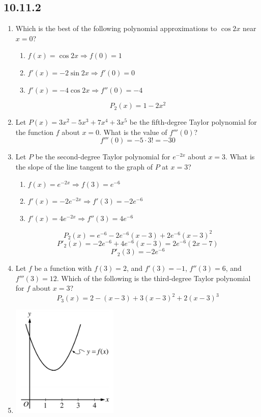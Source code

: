 \documentclass[12pt]{article}
\begin{document}
\subsection*{10.11.2}
\begin{enumerate}
	\item Which is the best of the following polynomial approximations to $\cos 2x$ near $x = 0$?
	      \begin{enumerate}
	      	\item $f(x) = \cos 2x \Longrightarrow f(0) = 1$
	      	\item $f'(x) = -2 \sin 2x \Longrightarrow f'(0) = 0$
	      	\item $f'(x) = -4 \cos 2x \Longrightarrow f''(0) = -4$
	      \end{enumerate}
	      $$\boxed{P_{2}(x) = 1-2x^2}$$
	\item Let $P(x)=3x^2-5x^3+7x^4+3x^5$
	      be the fifth-degree Taylor polynomial for the function $f$ about $x = 0$. What is the value of $f'''(0)$?
	      $$\boxed{f'''(0) = -5 \cdot 3! = -30}$$
	\item Let $P$ be the second-degree Taylor polynomial for $e^{-2x}$ about $x=3$. What is the slope of the line tangent to the graph of $P$ at $x =3$?
	      \begin{enumerate}
	      	\item $f(x) = e^{-2x} \Longrightarrow f(3) = e^{-6}$
	      	\item $f'(x) = -2 e^{-2x} \Longrightarrow f'(3) = -2e^{-6}$
	      	\item $f'(x) = 4 e^{-2x} \Longrightarrow f''(3) = 4e^{-6}$
	      \end{enumerate}
	      $$P_2(x) = e^{-6} - 2e^{-6}(x-3) + 2e^{-6}(x-3)^2$$
	      $$P'_2(x) = - 2e^{-6} + 4e^{-6} (x-3) = 2e^{-6}(2x-7)$$
	      $$\boxed{P'_2(3) = -2e^{-6}}$$
	\item Let $f$ be a function with $f(3) = 2$, and $f'(3) = -1$, $f''(3) = 6$, and $f'''(3) = 12$. Which of the following is the third-degree Taylor polynomial for $f$ about $x = 3$?
	      $$\boxed{P_3(x)= 2 - (x - 3) + 3(x - 3)^2 + 2(x-3)^3}$$
	\item 
	      \begin{center}
	      	\includegraphics*[width = 2in]{10.11.2.01.png}

\end{center}
\end{enumerate}
\end{document}
